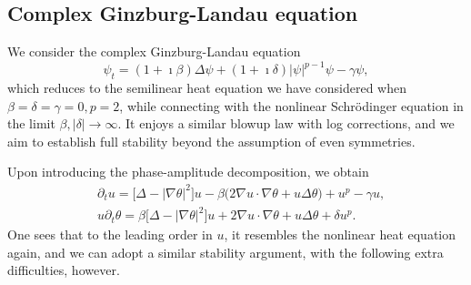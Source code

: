 \documentclass[12pt]{caltech_thesis}
\numberwithin{equation}{section}
\begin{document}
\subsection{Complex Ginzburg-Landau equation}
\label{subsec:cgl}
We consider the complex Ginzburg-Landau equation \begin{equation*} 
    \psi_t=(1+\imath\beta)\Delta \psi + (1+\imath \delta)|\psi|^{p-1}\psi- \gamma \psi, 
\end{equation*}
which reduces to the semilinear heat equation we have considered when $\beta=\delta=\gamma=0,p=2$, while connecting with the nonlinear Schr\"odinger equation in the limit $\beta, |\delta| \to \infty$. It enjoys a similar blowup law with log corrections, and we aim to establish full stability beyond the assumption of even symmetries.

Upon introducing the phase-amplitude decomposition, we obtain \begin{align*}
 &\partial_t u = \big[\Delta - |\nabla \theta|^2 \big]u - \beta\big(2 \nabla u \cdot \nabla \theta  + u \Delta \theta \big)  + u^p - \gamma u, \\
& u \partial_t \theta = \beta \big[\Delta - |\nabla \theta|^2   \big] u + 2 \nabla u \cdot \nabla \theta  + u \Delta \theta + \delta u^p .\end{align*}
One sees that to the leading order in $u$, it resembles the nonlinear heat equation again, and we can adopt a similar stability argument, with the following extra difficulties, however.
\end{document}
